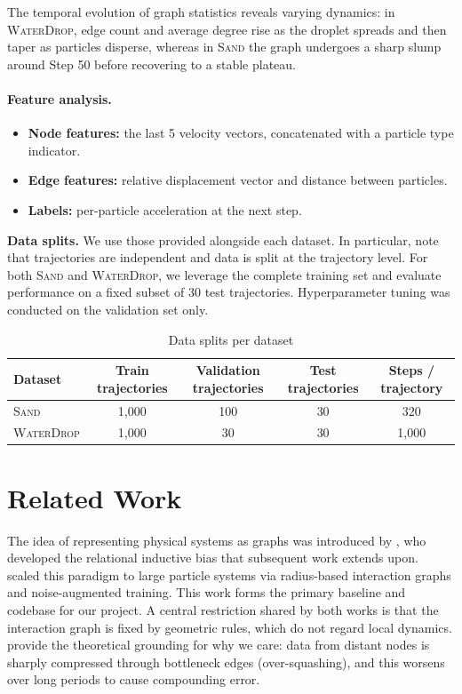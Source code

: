 \documentclass{article}
\begin{document}
The temporal evolution of graph 
statistics reveals varying dynamics: in \textsc{WaterDrop}, 
edge count and average degree rise as the droplet spreads and then taper as particles disperse, whereas in \textsc{Sand} the graph undergoes a sharp slump around Step 50 before recovering to a stable plateau.

\paragraph{Feature analysis.}
\begin{itemize}
    \item \textbf{Node features:} the last 5 velocity vectors, concatenated with a particle type indicator.
    \item \textbf{Edge features:} relative displacement vector and distance between particles.
    \item \textbf{Labels:} per-particle acceleration at the next step.
\end{itemize}

\textbf{Data splits.} We use those provided alongside each dataset. In particular, note that trajectories are independent and data is split at the trajectory level. For both \textsc{Sand} and \textsc{WaterDrop}, we leverage the complete training set and evaluate performance on a fixed subset of 30 test trajectories. Hyperparameter tuning was conducted on the validation set only. 

\begin{table}[h]
  \caption{Data splits per dataset}
  \label{tab:data_splits}
  \centering
  \begin{tabular}{lcccc}
    \toprule
    Dataset & Train trajectories & Validation trajectories & Test trajectories & Steps / trajectory \\
    \midrule
    \textsc{Sand}      & 1{,}000 & 100 & 30 & 320   \\
    \textsc{WaterDrop} & 1{,}000 & 30  & 30 & 1{,}000 \\
    \bottomrule
  \end{tabular}
\end{table}



\section{Related Work}
The idea of representing physical systems as graphs was introduced by \cite{battaglia2016}, who developed the relational inductive bias that subsequent work extends upon. \cite{gns2020} scaled this paradigm to large particle 
systems via radius-based interaction graphs and noise-augmented training. This work forms the 
primary baseline and codebase for our project. A central restriction shared by both 
works is that the interaction graph is fixed by geometric rules, which do not regard local dynamics. \cite{topping2022} provide the theoretical 
grounding for why we care: data from distant nodes is sharply compressed
through bottleneck edges (over-squashing), and this worsens over long periods to cause compounding error.
\end{document}
